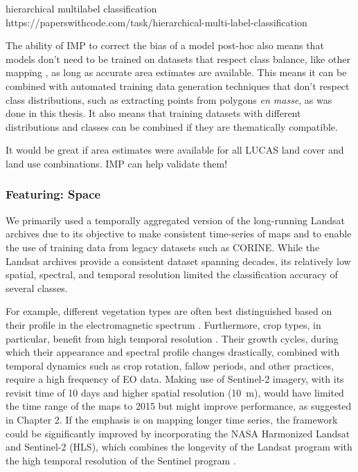         hierarchical multilabel classification https://paperswithcode.com/task/hierarchical-multi-label-classification
        
        
        The ability of IMP to correct the bias of a model post-hoc also means that models don't need to be trained on datasets that respect class balance, like other mapping \citep{waldner2016towards,kleinewillinghofer2022unbiased}, as long as accurate area estimates are available. This means it can be combined with automated training data generation techniques that don't respect class distributions, such as extracting points from polygons \textit{en masse}, as was done in this thesis. It also means that training datasets with different distributions and classes can be combined if they are thematically compatible.

        It would be great if area estimates were available for all LUCAS land cover and land use combinations. IMP can help validate them!

        \citep{sumbul2021bigearthnet}

        \subsubsection{Featuring: Space}
        
        We primarily used a temporally aggregated version of the long-running Landsat archives due to its objective to make consistent time-series of maps and to enable the use of training data from legacy datasets such as CORINE. While the Landsat archives provide a consistent dataset spanning decades, its relatively low spatial, spectral, and temporal resolution limited the classification accuracy of several classes. 
        
        For example, different vegetation types are often best distinguished based on their profile in the electromagnetic spectrum \citep{xu2021towards,CITE, CITE}. Furthermore, crop types, in particular, benefit from high temporal resolution \citep{esch2014differentiation,xu2021towards}. Their growth cycles, during which their appearance and spectral profile changes drastically, combined with temporal dynamics such as crop rotation, fallow periods, and other practices, require a high frequency of EO data. Making use of Sentinel-2 imagery, with its revisit time of 10 days and higher spatial resolution (10~m), would have limited the time range of the maps to 2015 but might improve performance, as suggested in Chapter 2. If the emphasis is on mapping longer time series, the framework could be significantly improved by incorporating the NASA Harmonized Landsat and Sentinel-2 (HLS), which combines the longevity of the Landsat program with the high temporal resolution of the Sentinel program \citep{claverie2018harmonized}.
        
